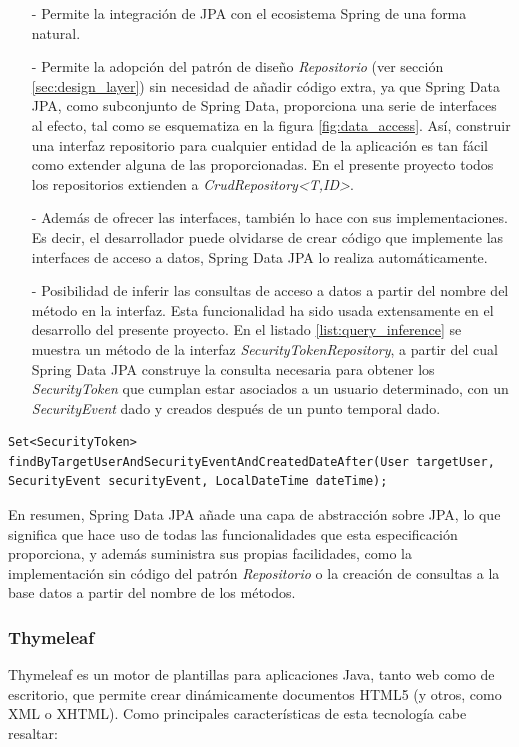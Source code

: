 \documentclass[a4paper]{article}
\begin{document}
    \begin{itemize}
    	\item[-] Permite la integración de JPA con el ecosistema Spring de una forma natural.
    	\item[-] Permite la adopción del patrón de diseño \emph{Repositorio} (ver sección \ref{sec:design_layer}) sin necesidad de añadir código extra, ya que Spring Data JPA, como subconjunto de Spring Data, proporciona una serie de interfaces al efecto, tal como se esquematiza en la figura \ref{fig:data_access}. Así, construir una interfaz repositorio para cualquier entidad de la aplicación es tan fácil como extender alguna de las proporcionadas. En el presente proyecto todos los repositorios extienden a \emph{CrudRepository\textless{}T,ID\textgreater{}}.
    	\item[-] Además de ofrecer las interfaces, también lo hace con sus implementaciones. Es decir, el desarrollador puede olvidarse de crear código que implemente las interfaces de acceso a datos, Spring Data JPA lo realiza automáticamente.
    	\item[-] Posibilidad de inferir las consultas de acceso a datos a partir del nombre del método en la interfaz. Esta funcionalidad ha sido usada extensamente en el desarrollo del presente proyecto. En el listado \ref{list:query_inference} se muestra un método de la interfaz \emph{SecurityTokenRepository}, a partir del cual Spring Data JPA construye la consulta necesaria para obtener los \emph{SecurityToken} que cumplan estar asociados a un usuario determinado, con un \emph{SecurityEvent} dado y creados después de un punto temporal dado.
    \end{itemize}
    
    \begin{lstlisting}[caption=Ejemplo de método a partir del cual Spring Data JPA infiere la consulta apropiada,label=list:query_inference]
    Set<SecurityToken> findByTargetUserAndSecurityEventAndCreatedDateAfter(User targetUser, SecurityEvent securityEvent, LocalDateTime dateTime);
    \end{lstlisting}
    
    En resumen, Spring Data JPA añade una capa de abstracción sobre JPA, lo que significa que hace uso de todas las funcionalidades que esta especificación proporciona, y además suministra sus propias facilidades, como la implementación sin código del patrón \emph{Repositorio} o la creación de consultas a la base datos a partir del nombre de los métodos.
    
    \subsubsection{Thymeleaf} \label{sec:thymeleaf}
    Thymeleaf es un motor de plantillas para aplicaciones Java, tanto web como de escritorio, que permite crear dinámicamente documentos HTML5 (y otros, como XML o XHTML). Como principales características de esta tecnología cabe resaltar:
    
\end{document}
